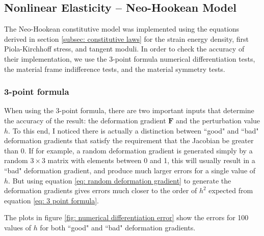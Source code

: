 \documentclass[]{spie}  %
\begin{document}
\subsection{Nonlinear Elasticity -- Neo-Hookean Model}
The Neo-Hookean constitutive model was implemented using the equations derived in section \ref{subsec: constitutive laws} for the strain energy density, first Piola-Kirchhoff stress, and tangent moduli. In order to check the accuracy of their implementation, we use the 3-point formula numerical differentiation tests, the material frame indifference tests, and the material symmetry tests. 

\subsubsection{3-point formula}
When using the 3-point formula, there are two important inputs that determine the accuracy of the result: the deformation gradient $\bm{F}$ and the perturbation value $h$. To this end, I noticed there is actually a distinction between ``good" and ``bad" deformation gradients that satisfy the requirement that the Jacobian be greater than 0. If for example, a random deformation gradient is generated simply by a random $3 \times 3$ matrix with elements between 0 and 1, this will usually result in a ``bad" deformation gradient, and produce much larger errors for a single value of $h$. But using equation \ref{eq: random deformation gradient} to generate the deformation gradients gives errors much closer to the order of $h^2$ expected from equation \ref{eq: 3 point formula}. 

The plots in figure \ref{fig: numerical differentiation error} show the errors for 100 values of $h$ for both ``good" and ``bad" deformation gradients. 
\end{document}
